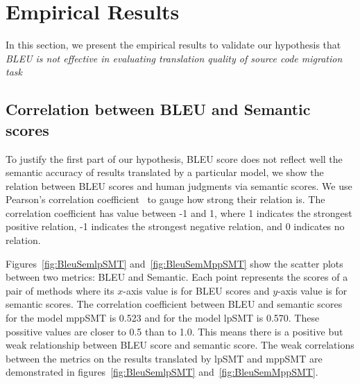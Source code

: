 \section{Empirical Results}
\label{sec:bleuresult}

In this section, we present the empirical results to validate our hypothesis that 
\textit{BLEU is not effective in evaluating translation quality of source code migration task}
\subsection{Correlation between BLEU and Semantic scores}
To justify the first part of our hypothesis, BLEU score does not reflect well 
the semantic accuracy of results translated by a particular model, 
we show the relation between BLEU scores and human judgments via semantic scores. 
We use Pearson's correlation coefficient~\cite{PearsonCorrelation} to gauge
how strong their relation is. The correlation coefficient has value
between -1 and 1, where 1 indicates the strongest positive relation, -1
indicates the strongest negative relation, and 0 indicates no relation.

Figures~\ref{fig:BleuSemlpSMT} and~\ref{fig:BleuSemMppSMT} show the
scatter plots between two metrics: BLEU and Semantic. Each point
represents the scores of a pair of methods where its $x$-axis value is
for BLEU scores and $y$-axis value is for semantic scores. The
correlation coefficient between BLEU and semantic scores for the model
mppSMT is 0.523 and for the model lpSMT is 0.570. These possitive values 
are closer to 0.5 than to 1.0. This means there is a positive but weak 
relationship between BLEU score and semantic score. The weak correlations %
between the metrics on the results translated by lpSMT and mppSMT are 
demonstrated in figures~\ref{fig:BleuSemlpSMT} and~\ref{fig:BleuSemMppSMT}.

